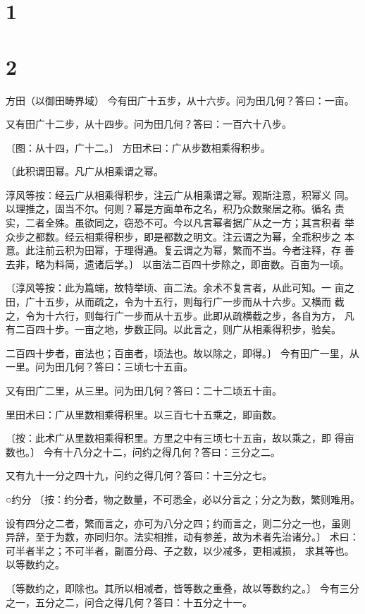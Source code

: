 \documentclass[a4paper,12pt,UTF8,twoside]{ctexbook}
\begin{document}
\section{1}
\section{2}

方田（以御田畴界域） 今有田广十五步，从十六步。问为田几何？答曰：一亩。

又有田广十二步，从十四步。问为田几何？答曰：一百六十八步。

〔图：从十四，广十二。〕 方田术曰：广从步数相乘得积步。

〔此积谓田幂。凡广从相乘谓之幂。

淳风等按：经云广从相乘得积步，注云广从相乘谓之幂。观斯注意，积幂义 同。以理推之，固当不尔。何则？幂是方面单布之名，积乃众数聚居之称。循名 责实，二者全殊。虽欲同之，窃恐不可。今以凡言幂者据广从之一方；其言积者 举众步之都数。经云相乘得积步，即是都数之明文。注云谓之为幂，全乖积步之 本意。此注前云积为田幂，于理得通。复云谓之为幂，繁而不当。今者注释，存 善去非，略为料简，遗诸后学。〕 以亩法二百四十步除之，即亩数。百亩为一顷。

〔淳风等按：此为篇端，故特举顷、亩二法。余术不复言者，从此可知。一 亩之田，广十五步，从而疏之，令为十五行，则每行广一步而从十六步。又横而 截之，令为十六行，则每行广一步而从十五步。此即从疏横截之步，各自为方， 凡有二百四十步。一亩之地，步数正同。以此言之，则广从相乘得积步，验矣。

二百四十步者，亩法也；百亩者，顷法也。故以除之，即得。〕 今有田广一里，从一里。问为田几何？答曰：三顷七十五亩。

又有田广二里，从三里。问为田几何？答曰：二十二顷五十亩。

里田术曰：广从里数相乘得积里。以三百七十五乘之，即亩数。

〔按：此术广从里数相乘得积里。方里之中有三顷七十五亩，故以乘之，即 得亩数也。〕 今有十八分之十二，问约之得几何？答曰：三分之二。

又有九十一分之四十九，问约之得几何？答曰：十三分之七。

○约分 〔按：约分者，物之数量，不可悉全，必以分言之；分之为数，繁则难用。

设有四分之二者，繁而言之，亦可为八分之四；约而言之，则二分之一也，虽则 异辞，至于为数，亦同归尔。法实相推，动有参差，故为术者先治诸分。〕 术曰：可半者半之；不可半者，副置分母、子之数，以少减多，更相减损， 求其等也。以等数约之。

〔等数约之，即除也。其所以相减者，皆等数之重叠，故以等数约之。〕 今有三分之一，五分之二，问合之得几何？答曰：十五分之十一。
\end{document}
